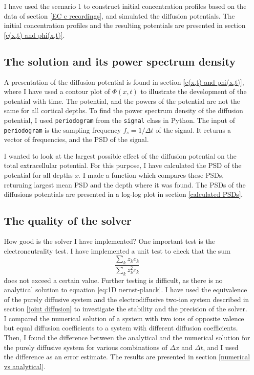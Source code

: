 \documentclass{article}
\begin{document}
I have used the scenario 1 to construct initial concentration profiles based on the data of section \ref{EC c recordings}, and simulated the diffusion potentials. The  initial concentration profiles and the resulting potentials are presented in section \ref{c(x,t) and phi(x,t)}.
\subsection{The solution and its power spectrum density}\label{PSD of solution}
A presentation of the diffusion potential is found in section \ref{c(x,t) and phi(x,t)}, where I have used a contour plot of $\Phi(x,t)$ to illustrate the development of the potential with time. The potential, and the powers of the potential are not the same for all cortical depths.
To find the power spectrum density of the diffusion potential, I used \texttt{periodogram}  from the \texttt{signal} class in Python. The input of \texttt{periodogram} is the sampling frequency $f_s = 1/\Delta t$ of the signal. It returns a vector of frequencies, and the PSD of the signal.

 I wanted to look at the largest possible effect of the diffusion potential on the total extracellular potential. For this purpose, I have calculated the PSD of the potential for all depths $x$. I made a function which compares these PSDs, returning largest mean PSD and the depth where it was found. The PSDs of the diffusions potentials are presented in a log-log plot in section \ref{calculated PSDs}. 

\subsection{The quality of the solver}
How good is the solver I have implemented? One important test is the electroneutrality test. I have implemented a unit test to check that the sum 
$$\frac{\sum_k z_k c_k}{\sum_k z_k^2 c_k}$$
does not exceed a certain value. Further testing is difficult, as there is no analytical solution to equation \ref{eq:1D nernst-planck}. I have used the equivalence of the purely diffusive system and the electrodiffusive two-ion system described in section \ref{joint diffusion} to investigate the stability and the precision of the solver. I compared the numerical solution of a system with two ions of opposite valence but equal diffusion coefficients to a system with different diffusion coefficients. 
Then, I found the difference between the analytical and the numerical solution for the purely diffusive system for various combinations of $\Delta x$ and $\Delta t$, and I used the difference as an error estimate. The results are presented in section \ref{numerical vs analytical}. 
\end{document}
